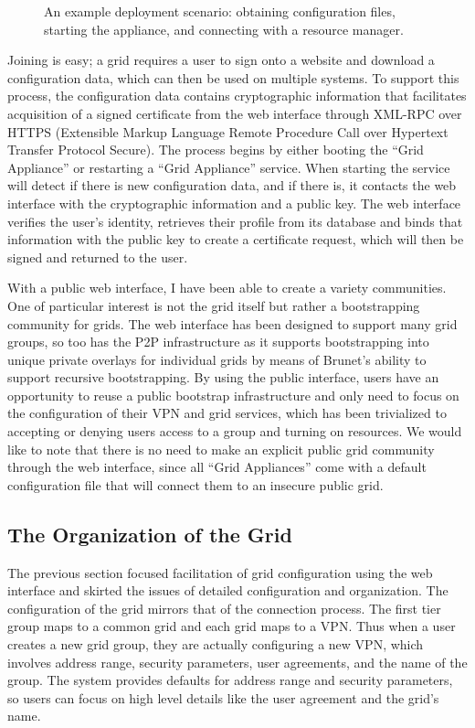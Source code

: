 \begin{figure}
\centering
{}
\caption[Grid Appliance deployment scenario]{An example deployment scenario:
obtaining configuration files, starting the appliance, and connecting with a
resource manager.}
\label{fig:system}
\end{figure}

Joining is easy; a grid requires a user to sign onto a website and download a
configuration data, which can then be used on multiple systems.  To support
this process, the configuration data contains cryptographic information that
facilitates acquisition of a signed certificate from the web interface through
XML-RPC over HTTPS (Extensible Markup Language Remote Procedure Call over
Hypertext Transfer Protocol Secure).  The process begins by either booting the
``Grid Appliance'' or restarting a ``Grid Appliance'' service.  When starting
the service will detect if there is new configuration data, and if there is, it
contacts the web interface with the cryptographic information and a public key.
The web interface verifies the user's identity, retrieves their profile from
its database and binds that information with the public key to create a
certificate request, which will then be signed and returned to the user.

With a public web interface, I have been able to create a variety communities.
One of particular interest is not the grid itself but rather a bootstrapping
community for grids.  The web interface has been designed to support many grid
groups, so too has the P2P infrastructure as it supports bootstrapping into
unique private overlays for individual grids by means of Brunet's ability to
support recursive bootstrapping.  By using the public interface, users have an
opportunity to reuse a public bootstrap infrastructure and only need to focus
on the configuration of their VPN and grid services, which has been trivialized
to accepting or denying users access to a group and turning on resources.  We
would like to note that there is no need to make an explicit public grid
community through the web interface, since all ``Grid Appliances'' come with a
default configuration file that will connect them to an insecure public grid.  

\subsection{The Organization of the Grid}

The previous section focused facilitation of grid configuration using the web
interface and skirted the issues of detailed configuration and organization.
The configuration of the grid mirrors that of the connection process.  The
first tier group maps to a common grid and each grid maps to a VPN.  Thus when
a user creates a new grid group, they are actually configuring a new VPN, which
involves address range, security parameters, user agreements, and the name of
the group.  The system provides defaults for address range and security
parameters, so users can focus on high level details like the user agreement
and the grid's name.

